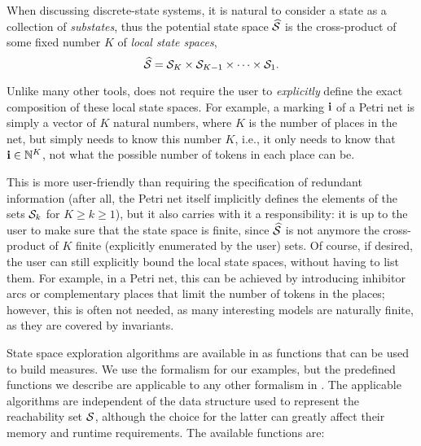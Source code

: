 When discussing discrete-state systems, it is natural to consider
a state as a collection of \emph{substates}, thus
the potential state space $\widehat{\mathcal{S}}$ is the
cross-product of some fixed number $K$ of \emph{local state spaces},
$$
  \widehat{\mathcal{S}} = \mathcal{S}_K \times \mathcal{S}_{K-1} \times \cdots \times \mathcal{S}_1 .
$$

Unlike many other tools, {\smart} does not require the user to
\emph{explicitly} define the exact composition of these local state spaces.
For example, a marking $\mathbf{i}$ of a Petri net is simply a vector of $K$
natural numbers, where $K$ is the number of places in the net,
but {\smart} simply needs to know this number $K$, i.e., it only needs to know
that $\mathbf{i} \in \mathbb{N}^K$, not what the possible number of tokens
in each place can be.

This is more user-friendly than requiring the
specification of redundant information (after all, the Petri net itself
implicitly defines the elements of the sets $\mathcal{S}_k$ for $K \geq k \geq 1$),
but it also carries with it a responsibility:
it is up to the user to make sure that the state space is finite,
since $\widehat{\mathcal{S}}$ is not anymore the cross-product of
$K$ finite (explicitly enumerated by the user) sets.
Of course, if desired, the user can still explicitly bound the local
state spaces, without having to list them.
For example, in a Petri net, this can be achieved by introducing inhibitor
arcs or complementary places that limit the number of tokens
in the places;
however, this is often not needed, as many interesting models
are naturally finite, as they are covered by invariants.

State space exploration algorithms are available in {\smart} as
functions that can be used to build measures.
We use the  formalism for our examples, but
the predefined functions we describe are applicable to any other
formalism in {\smart}.
The applicable algorithms are independent of the data structure used to
represent the reachability set $\mathcal{S}$, although the choice for the
latter can greatly affect their memory and runtime requirements.
The available functions are:

